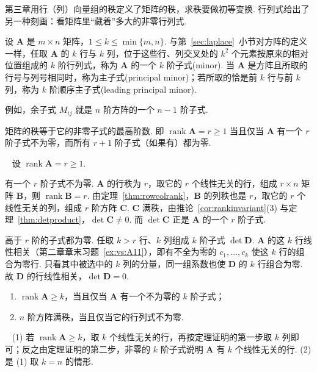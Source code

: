 \documentclass[lang=cn,10.5pt,scheme=chinese,toc=twocol,section,chinesefont=nofont,
twoside,citestyle=gb7714-2015,bibstyle=gb7714-2015]{elegantbook}
\DeclareRobustCommand{\textbf}[1]{{\lnsemiboldlatin\lnsemiboldcjk #1}}
\newcommand{\vv}[1]{\boldsymbol{#1}}
\numberwithin{equation}{section}   %
\newcommand{\rk}{\operatorname{rank}}       %
\newcommand*{\lnlabel}[1]{{\sffamily\bfseries\color{black}#1}}
\renewenvironment{proof}{%
	\par\noindent\lnlabel{\proofname}\;\ \color{black!90}\cfs}{\par}
\begin{document}
第三章用行（列）向量组的秩定义了矩阵的秩，求秩要做初等变换. 行列式给出了另一种刻画：看矩阵里“藏着”多大的非零行列式.

\begin{definition}
  设 $\vv A$ 是 $m\times n$ 矩阵，$1\le k\le\min\{m,n\}$. 与第~\ref{sec:laplace}~小节对方阵的定义一样，任取 $\vv A$ 的 $k$ 行与 $k$ 列，位于这些行、列交叉处的 $k^2$ 个元素按原来的相对位置组成的 $k$ 阶行列式，称为 $\vv A$ 的一个 $k$ 阶\textbf{子式}(minor). 当 $\vv A$ 是方阵且所取的行号与列号相同时，称为\textbf{主子式}(principal minor)；若所取的恰是前 $k$ 行与前 $k$ 列，称为 $k$ 阶\textbf{顺序主子式}(leading principal minor).
\end{definition}

例如，余子式 $M_{ij}$ 就是 $n$ 阶方阵的一个 $n-1$ 阶子式.

\begin{theorem}
  \label{thm:minorrank}
  矩阵的秩等于它的非零子式的最高阶数. 即 $\rk\vv A=r\ge1$ 当且仅当 $\vv A$ 有一个 $r$ 阶子式不为零，而所有 $r+1$ 阶子式（如果有）都为零.
\end{theorem}
\begin{proof}
  设 $\rk\vv A=r\ge1$.

  \textbf{有一个 $r$ 阶子式不为零.} $\vv A$ 的行秩为 $r$，取它的 $r$ 个线性无关的行，组成 $r\times n$ 矩阵 $\vv B$，则 $\rk\vv B=r$. 由定理~\ref{thm:rowcolrank}，$\vv B$ 的列秩也是 $r$，取它的 $r$ 个线性无关的列，组成 $r$ 阶方阵 $\vv C$. $\vv C$ 满秩，由推论~\ref{cor:rankinvariant}(3) 与定理~\ref{thm:detproduct}，$\det\vv C\ne0$. 而 $\det\vv C$ 正是 $\vv A$ 的一个 $r$ 阶子式.

  \textbf{高于 $r$ 阶的子式都为零.} 任取 $k>r$ 行、$k$ 列组成 $k$ 阶子式 $\det\vv D$. $\vv A$ 的这 $k$ 行线性相关（第二章章末习题~\ref{ex:vs:A11}），即有不全为零的 $c_1,\ldots,c_k$ 使这 $k$ 行的组合为零行. 只看其中被选中的 $k$ 列的分量，同一组系数也使 $\vv D$ 的 $k$ 行组合为零. 故 $\vv D$ 的行线性相关，$\det\vv D=0$.
\end{proof}

\begin{corollary}
  \label{cor:minorrank}
  \begin{enumerate}
    \item $\rk\vv A\ge k$，当且仅当 $\vv A$ 有一个不为零的 $k$ 阶子式；
    \item $n$ 阶方阵满秩，当且仅当它的行列式不为零.
  \end{enumerate}
\end{corollary}
\begin{proof}
  (1) 若 $\rk\vv A\ge k$，取 $k$ 个线性无关的行，再按定理证明的第一步取 $k$ 列即可；反之由定理证明的第二步，非零的 $k$ 阶子式说明 $\vv A$ 有 $k$ 个线性无关的行. (2) 是 (1) 取 $k=n$ 的情形.
\end{proof}
\end{document}
